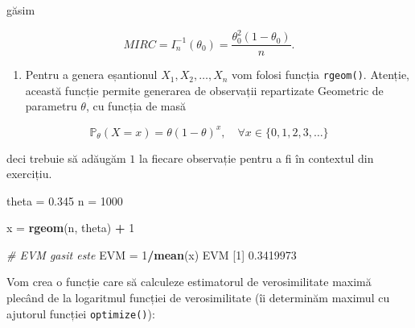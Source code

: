 \documentclass[]{article}
\newenvironment{Shaded}{\begin{snugshade}}{\end{snugshade}}
\newcommand{\KeywordTok}[1]{\textcolor[rgb]{0.13,0.29,0.53}{\textbf{#1}}}
\newcommand{\DecValTok}[1]{\textcolor[rgb]{0.00,0.00,0.81}{#1}}
\newcommand{\FloatTok}[1]{\textcolor[rgb]{0.00,0.00,0.81}{#1}}
\newcommand{\StringTok}[1]{\textcolor[rgb]{0.31,0.60,0.02}{#1}}
\newcommand{\CommentTok}[1]{\textcolor[rgb]{0.56,0.35,0.01}{\textit{#1}}}
\newcommand{\OperatorTok}[1]{\textcolor[rgb]{0.81,0.36,0.00}{\textbf{#1}}}
\newcommand{\NormalTok}[1]{#1}
\providecommand{\tightlist}{%
  \setlength{\itemsep}{0pt}\setlength{\parskip}{0pt}}
\begin{document}
găsim

\[
  MIRC = I_n^{-1}(\theta_0) = \frac{\theta_0^2(1-\theta_0)}{n}.
\]

\begin{enumerate}
\def\labelenumi{\alph{enumi})}
\setcounter{enumi}{6}
\tightlist
\item
  Pentru a genera eșantionul \(X_1, X_2, \ldots, X_n\) vom folosi
  funcția \texttt{rgeom()}. Atenție, această funcție permite generarea
  de observații repartizate Geometric de parametru \(\theta\), cu
  funcția de masă
\end{enumerate}

\[
 \mathbb{P}_{\theta}(X = x) = \theta (1-\theta)^{x}, \quad \forall x\in\{0,1,2,3,\ldots\}  
\]

deci trebuie să adăugăm \(1\) la fiecare observație pentru a fi în
contextul din exercițiu.

\begin{Shaded}
\begin{Highlighting}[]
\NormalTok{theta =}\StringTok{ }\FloatTok{0.345}
\NormalTok{n =}\StringTok{ }\DecValTok{1000}

\NormalTok{x =}\StringTok{ }\KeywordTok{rgeom}\NormalTok{(n, theta) }\OperatorTok{+}\StringTok{ }\DecValTok{1}

\CommentTok{# EVM gasit este }
\NormalTok{EVM =}\StringTok{ }\DecValTok{1}\OperatorTok{/}\KeywordTok{mean}\NormalTok{(x)}
\NormalTok{EVM}
\NormalTok{[}\DecValTok{1}\NormalTok{] }\FloatTok{0.3419973}
\end{Highlighting}
\end{Shaded}

Vom crea o funcție care să calculeze estimatorul de verosimilitate
maximă plecând de la logaritmul funcției de verosimilitate (îi
determinăm maximul cu ajutorul funcției \texttt{optimize()}):
\end{document}
